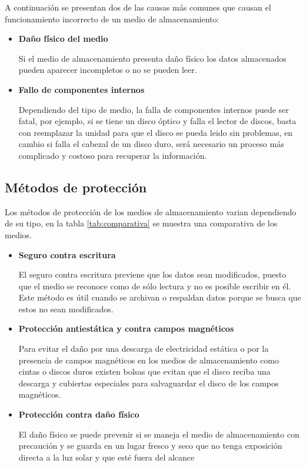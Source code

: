 A continuaci\'{o}n se presentan dos de las causas m\'{a}s comunes que causan el funcionamiento incorrecto de un medio de almacenamiento:

    \begin{itemize}

      \item \textbf{Da\~{n}o f\'{i}sico del medio}

Si el medio de almacenamiento presenta da\~{n}o f\'{i}sico los datos almacenados pueden aparecer incompletos o no se pueden leer.


      \item \textbf{Fallo de componentes internos}

Dependiendo del tipo de medio, la falla de componentes internos puede ser fatal, por ejemplo, si se tiene un disco \'{o}ptico y falla el lector de discos, basta con reemplazar la unidad para que el disco se pueda leido sin problemas, en cambio si falla el cabezal de un disco duro, ser\'{a} necesario un proceso m\'{a}s complicado y costoso para recuperar la informaci\'{o}n.


    \end{itemize}

  \subsection {M\'{e}todos de protecci\'{o}n}

Los m\'{e}todos de protecci\'{o}n de los medios de almacenamiento varian dependiendo de su tipo, en la tabla \ref{tab:comparativa} se muestra una comparativa de los medios.

    \begin{itemize}

      \item \textbf{Seguro contra escritura}

El seguro contra escritura previene que los datos sean modificados, puesto que el medio se reconoce como de s\'{o}lo lectura y no es posible escribir en \'{e}l. Este m\'{e}todo es \'{u}til cuando se archivan o respaldan datos porque se busca que estos no sean modificados.

      \item \textbf{Protecci\'{o}n antiest\'{a}tica y contra campos magn\'{e}ticos}

Para evitar el da\~{n}o por una descarga de electricidad est\'{a}tica o por la presencia de campos magn\'{e}ticos en los medios de almacenamiento como cintas o discos duros existen bolsas que evitan que el disco reciba una descarga y cubiertas especiales para salvaguardar el disco de los campos magn\'{e}ticos.

      \item \textbf{Protecci\'{o}n contra da\~{n}o f\'{i}sico}

El da\~{n}o f\'{i}sico se puede prevenir si se maneja el medio de almacenamiento con precauci\'{o}n y se guarda en un lugar fresco y seco que no tenga exposici\'{o}n directa a la luz solar y que est\'{e} fuera del alcance

    \end{itemize}

